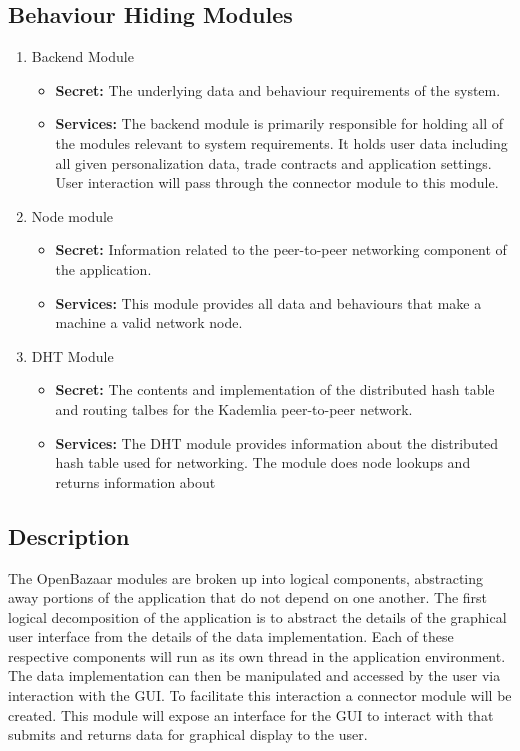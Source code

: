 \documentclass{article}
\begin{document}
\subsection{Behaviour Hiding Modules}
\begin{enumerate}
\item
Backend Module
\begin{itemize}
\item
\textbf{Secret:} The underlying data and behaviour requirements of the system.

\item
\textbf{Services:} The backend module is primarily responsible for holding all of the modules relevant to system requirements. It holds user data including all given personalization data, trade contracts and application settings. User interaction will pass through the connector module to this module.
\end{itemize}

\item
Node module
\begin{itemize}
\item
\textbf{Secret:} Information related to the peer-to-peer networking component of the application.

\item
\textbf{Services:} This module provides all data and behaviours that make a machine a valid network node.
\end{itemize}

\item
DHT Module
\begin{itemize}
\item
\textbf{Secret:} The contents and implementation of the distributed hash table and routing talbes for the Kademlia peer-to-peer network.

\item
\textbf{Services:} The DHT module provides information about the distributed hash table used for networking. The module does node lookups and returns information about 
\end{itemize}
\end{enumerate}

\subsection*{Description}
The OpenBazaar modules are broken up into logical components, abstracting away portions of the application that do not depend on one another. The first logical decomposition of the application is to abstract the details of the graphical user interface from the details of the data implementation. Each of these respective components will run as its own thread in the application environment. The data implementation can then be manipulated and accessed by the user via interaction with the GUI. To facilitate this interaction a connector module will be created. This module will expose an interface for the GUI to interact with that submits and returns data for graphical display to the user.
\end{document}

